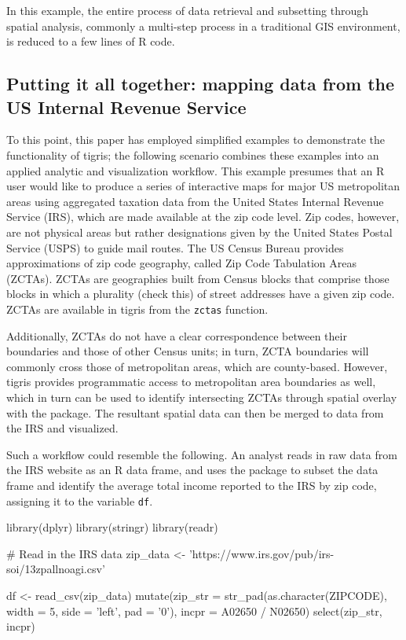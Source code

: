 In this example, the entire process of data retrieval and subsetting
through spatial analysis, commonly a multi-step process in a traditional
GIS environment, is reduced to a few lines of R code.

\subsection{Putting it all together: mapping data from the US Internal
Revenue
Service}\label{putting-it-all-together-mapping-data-from-the-us-internal-revenue-service}

To this point, this paper has employed simplified examples to
demonstrate the functionality of tigris; the following scenario combines
these examples into an applied analytic and visualization workflow. This
example presumes that an R user would like to produce a series of
interactive maps for major US metropolitan areas using aggregated
taxation data from the United States Internal Revenue Service (IRS),
which are made available at the zip code level. Zip codes, however, are
not physical areas but rather designations given by the United States
Postal Service (USPS) to guide mail routes. The US Census Bureau
provides approximations of zip code geography, called Zip Code
Tabulation Areas (ZCTAs). ZCTAs are geographies built from Census blocks
that comprise those blocks in which a plurality (check this) of street
addresses have a given zip code. ZCTAs are available in tigris from the
\texttt{zctas} function.

Additionally, ZCTAs do not have a clear correspondence between their
boundaries and those of other Census units; in turn, ZCTA boundaries
will commonly cross those of metropolitan areas, which are county-based.
However, tigris provides programmatic access to metropolitan area
boundaries as well, which in turn can be used to identify intersecting
ZCTAs through spatial overlay with the  package. The
resultant spatial data can then be merged to data from the IRS and
visualized.

Such a workflow could resemble the following. An analyst reads in raw
data from the IRS website as an R data frame, and uses the
 package to subset the data frame and identify the
average total income reported to the IRS by zip code, assigning it to
the variable \texttt{df}.

\begin{Schunk}
\begin{Sinput}
library(dplyr)
library(stringr)
library(readr)

# Read in the IRS data
zip_data <- 'https://www.irs.gov/pub/irs-soi/13zpallnoagi.csv'

df <- read_csv(zip_data) %>%
  mutate(zip_str = str_pad(as.character(ZIPCODE), width = 5, side = 'left', pad = '0'), 
         incpr = A02650 / N02650) %>%
  select(zip_str, incpr)
\end{Sinput}
\end{Schunk}

